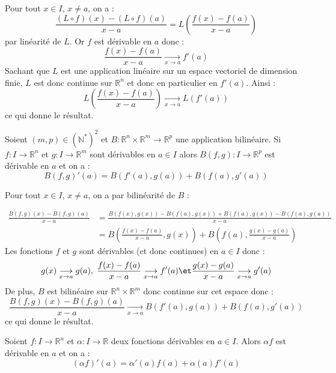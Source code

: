 \documentclass[a4paper,10pt]{report}
\begin{document}
\begin{preuve} Pour tout $x \in I$, $x \neq a$, on a :
$$ \dfrac{(L \circ f)(x) - (L \circ f)(a) }{x-a} = L \left( \frac{f(x)-f(a)}{x-a} \right)$$
par linéarité de $L$. Or $f$ est dérivable en $a$ donc :
$$ \frac{f(x)-f(a)}{x-a} \underset{x \rightarrow a}{\longrightarrow} f'(a)$$
Sachant que $L$ est une application linéaire sur un espace vectoriel de dimension finie, $L$ est donc continue sur $\mathbb{R}^n$ et donc en particulier en $f'(a)$. Ainsi :
$$ L \left( \frac{f(x)-f(a)}{x-a} \right) \underset{x \rightarrow a}{\longrightarrow} L(f'(a))$$
ce qui donne le résultat.
\end{preuve}


\begin{prop}
Soient $(m,p) \in (\mathbb{N}^*)^2$ et $B : \mathbb{R}^n \times \mathbb{R}^m \rightarrow \mathbb{R}^p$ une application bilinéaire. Si $f : I \rightarrow \mathbb{R}^n$ et $g : I \rightarrow \mathbb{R}^m$ sont dérivables en $a \in I$ alors $B(f,g):  I \rightarrow \mathbb{R}^p$ est dérivable en $a$ et on a :
$$ B(f,g)'(a)= B(f'(a),g(a))+B(f(a),g'(a))$$
\end{prop}

\begin{preuve}
Pour tout $x \in I$, $x \neq a$, on a par bilinéarité de $B$ :

\begin{align*}
\frac{B(f,g)(x)-B(f,g)(a)}{x-a} & =\frac{B(f(x),g(x))-B(f(a),g(x))+B(f(a),g(x))-B(f(a),g(a))}{x-a} \\
& = B \left( \frac{f(x)-f(a)}{x-a},g(x) \right) + B \left( f(a), \frac{g(x)-g(a)}{x-a} \right) 
\end{align*}
Les fonctions $f$ et $g$ sont dérivables (et donc continues) en $a \in I$ donc :
$$ g(x) \underset{x \rightarrow a}{\longrightarrow} g(a), \; \frac{f(x)-f(a)}{x-a}\underset{x \rightarrow a}{\longrightarrow} f'(a) \et \frac{g(x)-g(a)}{x-a} \underset{x \rightarrow a}{\longrightarrow} g'(a)$$
De plus, $B$ est bilinéaire sur $\mathbb{R}^n \times \mathbb{R}^m$ donc continue sur cet espace donc :
$$ \frac{B(f,g)(x)-B(f,g)(a)}{x-a}   \underset{x \rightarrow a}{\longrightarrow}  B(f'(a),g(a))+ B(f(a),g'(a))$$
ce qui donne le résultat.
\end{preuve}

\begin{cor} Soient $f : I \rightarrow \mathbb{R}^n$ et $\alpha : I \rightarrow \mathbb{R}$ deux fonctions dérivables en $a \in I$. Alors $\alpha f $ est dérivable en $a$ et on a :
$$ (\alpha f)'(a) = \alpha'(a) f(a) + \alpha(a) f'(a)$$
\end{cor}
\end{document}
